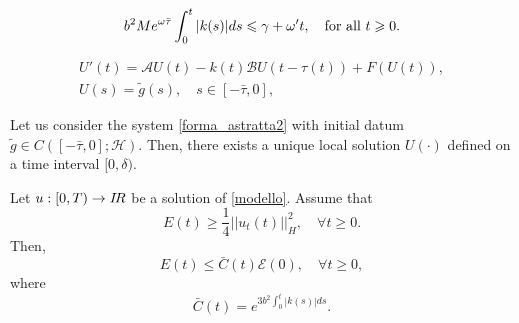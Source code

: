 \documentclass[10pt,a4paper]{amsart}
\newcommand{\RR}{{{\rm I} \kern -.15em {\rm R} }}
\renewcommand{\geq}{\geqslant}
\renewcommand{\ge}{\geqslant}
\renewcommand{\leq}{\leqslant}
\begin{document}
\begin{equation}
\label{ipotesi2}
b^2 Me^{\omega\bar\tau} \int_0^t  |k(s)| ds \leq \gamma +\omega 't, \quad \mbox{\rm for all}\ t\ge 0.
\end{equation}

\begin{equation}
\label{forma_astratta2}
\begin{array}{l}
\displaystyle{ U'(t)= \mathcal{A} U(t)-k(t)\mathcal{B}U(t-\tau(t))+F(U(t)),}\\
\displaystyle{ U(s)=\tilde g(s), \quad s\in [-\bar\tau, 0],}
\end{array}
\end{equation}

\begin{Theorem}
	\label{lemma1senzabound}
	Let us consider the system \eqref{forma_astratta2} with initial datum $\tilde g\in C([-\bar{\tau},0]; \mathcal{H}).$ Then, there exists a unique local solution $U(\cdot)$ defined on a time  interval $[0,\delta)$. 
\end{Theorem}

\begin{Lemma}\label{stimaE}
	Let $u:[0,T)\rightarrow \RR$ be a solution of \eqref{modello}.
	Assume that
	\begin{equation} \label{e(t)}
		E(t)\geq \frac{1}{4}||u_t(t)||_H^2,\quad \forall t\geq 0.
	\end{equation}
	Then,
	\begin{equation}
		\label{disuguaglianza energia}
		E(t)\leq \bar{C}(t)\mathcal{E}(0),\quad \forall t\geq 0,
	\end{equation}
	where
	\begin{equation}\label{Cbar}
		\bar{C}(t)=e^{3b^2\int_0^t|k(s)|  ds}.
	\end{equation}
\end{Lemma}
\end{document}
